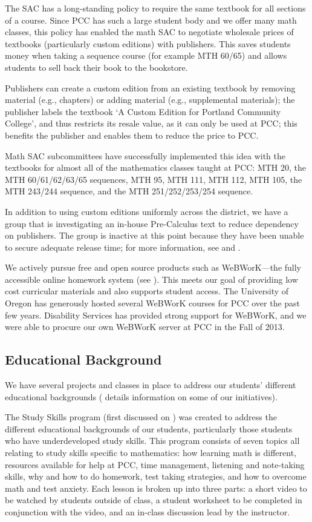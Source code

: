 The SAC has a long-standing policy to require the same textbook for all
sections of a course. Since PCC has such a large student body and we offer many
math classes, this policy has enabled the math SAC to negotiate wholesale
prices of textbooks (particularly custom editions) with publishers.  This saves
students money when taking a sequence course (for example MTH 60/65) and allows
students to sell back their book to the bookstore.

Publishers can create a custom edition from an existing textbook by removing
material (e.g., chapters) or adding material (e.g., supplemental materials);
the publisher labels the textbook `A Custom Edition for Portland Community
College', and thus restricts its resale value, as it can only be used at PCC;
this benefits the publisher and enables them to reduce the price to PCC.  

Math SAC subcommittees have successfully implemented this idea with the
textbooks for almost all of the mathematics classes taught at PCC: MTH 20, the
MTH 60/61/62/63/65 sequences, MTH 95, MTH 111, MTH 112, MTH 105, the MTH 243/244
sequence, and the MTH 251/252/253/254 sequence.

In addition to using custom editions uniformly across the district, we have a
group that is investigating an in-house Pre-Calculus text to reduce dependency
on publishers. The group is inactive at this point because they have been
unable to secure adequate release time; for more information, see
 and \cite{mth111project}.

We actively pursue free and open source products such as WeBWorK---the fully
accessible online homework system (see ). This
meets our goal of providing low cost curricular materials and also supports
student access. The University of Oregon has generously hosted several WeBWorK
courses for PCC over the past few years.  Disability Services has provided
strong support for WeBWorK, and we were able to procure our own WeBWorK server
at PCC in the Fall of 2013.

\subsection{Educational Background}
We have several projects and classes in place to address our students'
different educational backgrounds ( details information on
some of our initiatives).

The Study Skills program (first discussed on ) was created to address the different educational
backgrounds of our students, particularly those students who have
underdeveloped study skills. This program consists of seven topics all relating
to study skills specific to mathematics: how learning math is different,
resources available for help at PCC, time management, listening and note-taking
skills, why and how to do homework, test taking strategies, and how to overcome
math and test anxiety.  Each lesson is broken up into three parts: a short
video to be watched by students outside of class, a student worksheet to be
completed in conjunction with the video, and an in-class discussion lead by the
instructor. 

